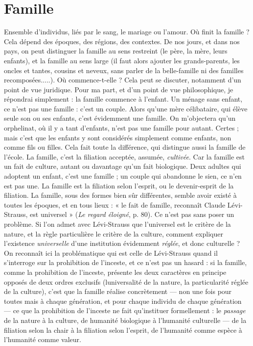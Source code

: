 \section{Famille}
Ensemble d'individus, liés par le sang, le mariage ou l'amour.
Où finit la famille ? Cela dépend des époques, des régions, des
contextes. De nos jours, et dans nos pays, on peut distinguer la famille au sens
restreint (le père, la mère, leurs enfants), et la famille au sens large (il faut alors
ajouter les grands-parents, les oncles et tantes, cousins et neveux, sans parler de
la belle-famille ni des familles recomposées.....). Où commence-t-elle ? Cela
peut se discuter, notamment d’un point de vue juridique. Pour ma part, et
d’un point de vue philosophique, je répondrai simplement : la famille commence
à l'enfant. Un ménage sans enfant, ce n’est pas une famille : c’est un
couple. Alors qu’une mère célibataire, qui élève seule son ou ses enfants, c’est
évidemment une famille. On m'objectera qu’un orphelinat, où il y a tant
d’enfants, n’est pas une famille pour autant. Certes ; mais c’est que les enfants
y sont considérés simplement comme enfants, non comme fils ou filles. Cela
fait toute la différence, qui distingue aussi la famille de l’école. La famille, c’est
la filiation acceptée, assumée, {\it cultivée}. Car la famille est un fait de culture,
autant ou davantage qu’un fait biologique. Deux adultes qui adoptent un
enfant, c’est une famille ; un couple qui abandonne le sien, ce n’en est pas une.
La famille est la filiation selon l'esprit, ou le devenir-esprit de la filiation.
La famille, sous des formes bien sûr différentes, semble avoir existé à toutes
les époques, et en tous lieux : « le fait de famille, reconnaît Claude Lévi-Strauss,
est universel » ({\it Le regard éloigné}, p. 80). Ce n’est pas sans poser un problème.
Si l’on admet avec Lévi-Strauss que l’universel est le critère de la nature, et la
règle particulière le critère de la culture, comment expliquer l'existence {\it universelle}
d’une institution évidemment {\it réglée}, et donc culturelle ? On reconnaît ici
la problématique qui est celle de Lévi-Strauss quand il s'interroge sur la prohibition
de l'inceste, et ce n’est pas un hasard : si la famille, comme la prohibition
de l'inceste, présente les deux caractères en principe opposés de deux ordres
exclusifs (luniversalité de la nature, la particularité réglée de la culture), c’est
que la famille réalise concrètement — non une fois pour toutes mais à chaque
génération, et pour chaque individu de chaque génération — ce que la prohibition
de l’inceste ne fait qu’instituer formellement : le {\it passage} de la nature à la
culture, de humanité biologique à l’humanité culturelle — de la filiation selon
la chair à la filiation selon l'esprit, de l'humanité comme espèce à l’humanité
comme valeur.

